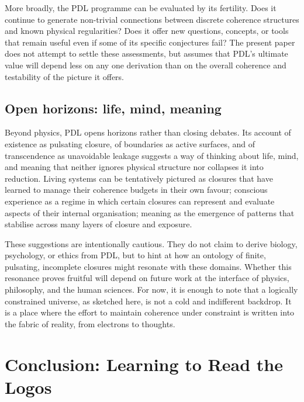 \documentclass[11pt,a4paper]{article}
\theoremstyle{definition}
\begin{document}
More broadly, the PDL programme can be evaluated by its fertility. Does it continue to generate non-trivial connections between discrete coherence structures and known physical regularities? Does it offer new questions, concepts, or tools that remain useful even if some of its specific conjectures fail?\cite{Laubscher_PDL_GlobalMapping_v6_2024,Laubscher_CavityModes_PDL_2024} The present paper does not attempt to settle these assessments, but assumes that PDL’s ultimate value will depend less on any one derivation than on the overall coherence and testability of the picture it offers.

\subsection{Open horizons: life, mind, meaning}

Beyond physics, PDL opens horizons rather than closing debates. Its account of existence as pulsating closure, of boundaries as active surfaces, and of transcendence as unavoidable leakage suggests a way of thinking about life, mind, and meaning that neither ignores physical structure nor collapses it into reduction.\cite{Laubscher_Existence_PulsatingClosure_2026,Laubscher_PDL_TO_Dialogue_2024} Living systems can be tentatively pictured as closures that have learned to manage their coherence budgets in their own favour; conscious experience as a regime in which certain closures can represent and evaluate aspects of their internal organisation; meaning as the emergence of patterns that stabilise across many layers of closure and exposure.

These suggestions are intentionally cautious. They do not claim to derive biology, psychology, or ethics from PDL, but to hint at how an ontology of finite, pulsating, incomplete closures might resonate with these domains.\cite{Laubscher_Existence_PulsatingClosure_2026} Whether this resonance proves fruitful will depend on future work at the interface of physics, philosophy, and the human sciences. For now, it is enough to note that a logically constrained universe, as sketched here, is not a cold and indifferent backdrop. It is a place where the effort to maintain coherence under constraint is written into the fabric of reality, from electrons to thoughts.

\section{Conclusion: Learning to Read the Logos}
\label{sec:conclusion}
\end{document}
